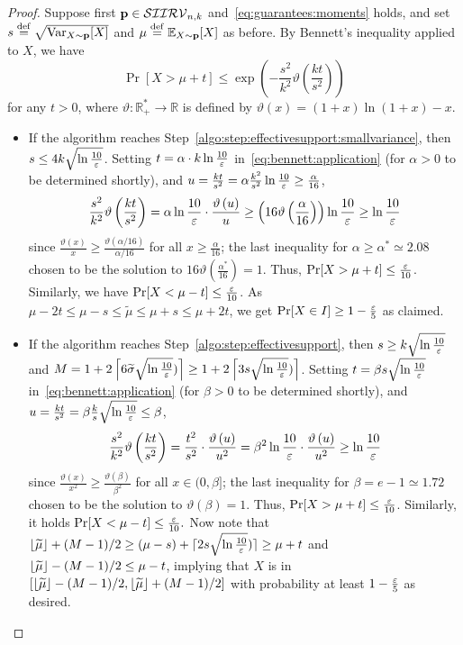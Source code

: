 \begin{proof}Suppose first $\p\in\classksiirv[n]{k}$ and~\eqref{eq:guarantees:moments} holds, and set $s\eqdef \sqrt{\var_{X\sim\p}[X]}$ and $\mu\eqdef \shortexpect_{X\sim\p}[X]$ as before. By Bennett's inequality applied to $X$, we have
  \begin{equation}\label{eq:bennett:application}
    \Pr[ X > \mu+t ] \leq \exp\left(- \frac{s^2}{k^2} \vartheta\left( \frac{kt}{s^2} \right) \right)
  \end{equation}
  for any $t>0$, where $\vartheta\colon\mathbb{R}_+^\ast\to\mathbb{R}$ is defined by $\vartheta(x) = (1+x)\ln(1+x)-x$.
\begin{itemize}
  \item If the algorithm reaches Step~\ref{algo:step:effectivesupport:smallvariance}, then $s\leq 4k \sqrt{\ln\frac{10}{\eps}}$. Setting $t=\alpha\cdot k \ln\frac{10}{\eps}$ in~\cref{eq:bennett:application} (for $\alpha>0$ to be determined shortly), and $u = \frac{kt}{s^2} = \alpha\frac{k^2}{s^2}\ln\frac{10}{\eps} \geq \frac{\alpha}{16}$, 
  \[
      \frac{s^2}{k^2} \vartheta\left( \frac{kt}{s^2} \right) = \alpha\ln\frac{10}{\eps} \cdot \frac{\vartheta\left( u \right)}{u}
      \geq \left(16\vartheta\left( \frac{\alpha}{16} \right)\right) \ln\frac{10}{\eps} \geq \ln\frac{10}{\eps}
  \]
  since $\frac{\vartheta\left(x\right)}{x} \geq \frac{\vartheta\left(\alpha/16\right)}{\alpha/16}$ for all $x\geq \frac{\alpha}{16}$; the last inequality for $\alpha\geq \alpha^\ast \simeq 2.08$ chosen to be the solution to $16\vartheta\left( \frac{\alpha^\ast}{16} \right)=1$. Thus, $\Pr[X > \mu+t] \leq \frac{\eps}{10}$. Similarly, we have $\Pr[ X < \mu-t ] \leq \frac{\eps}{10}$.
  As $\mu-2t\leq\mu-s\leq \widetilde{\mu} \leq \mu+s \leq \mu +2t$, we get $\Pr[ X \in I ] \geq 1-\frac{\eps}{5}$ as claimed.

  \item If the algorithm reaches Step~\ref{algo:step:effectivesupport}, then $s\geq k \sqrt{\ln\frac{10}{\eps}}$ and $M = 1+2\clg{ 6\widetilde{\sigma}\sqrt{\ln\frac{10}{\eps}}) } \geq 1+2\clg{ 3s\sqrt{\ln\frac{10}{\eps}}) }$. Setting $t=\beta s \sqrt{ \ln\frac{10}{\eps}}$ in~\cref{eq:bennett:application} (for $\beta>0$ to be determined shortly), and $u = \frac{kt}{s^2} = \beta\frac{k}{s}\sqrt{ \ln\frac{10}{\eps}}\leq \beta$, 
  \[
      \frac{s^2}{k^2} \vartheta\left( \frac{kt}{s^2} \right) = \frac{t^2}{s^2} \cdot \frac{\vartheta\left( u \right)}{u^2}
      = \beta^2\ln\frac{10}{\eps}\cdot \frac{\vartheta\left(u\right)}{u^2} \geq \ln\frac{10}{\eps}
  \]
  since $\frac{\vartheta\left(x\right)}{x^2} \geq \frac{\vartheta\left(\beta\right)}{\beta^2}$ for all $x\in(0,\beta]$; the last inequality for $\beta= e-1 \simeq 1.72$ chosen to be the solution to $\vartheta\left( \beta \right)=1$. Thus, $\Pr[X > \mu+t] \leq \frac{\eps}{10}$. Similarly, it holds $\Pr[ X < \mu-t ] \leq \frac{\eps}{10}.$
Now note that $ \lfloor\widetilde{\mu} \rfloor+(M-1)/2 \geq (\mu-s)+\lceil 2s\sqrt{\ln\frac{10}{\eps}}) \rceil \geq \mu + t$
and $\flr{ \widetilde{\mu} } - (M-1)/2 \leq \mu-t$, implying that $X$ is in $[\flr{ \widetilde{\mu} }-(M-1)/2, \flr{ \widetilde{\mu} }+(M-1)/2]$ with probability at least $1- \frac{\eps}{5}$ as desired.
\end{itemize}


\end{proof}
